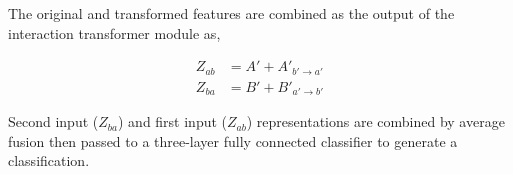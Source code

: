 \documentclass{article}
\begin{document}
\noindent The original and transformed features are combined as the output of the interaction transformer module as,

\begin{align}
Z_{ab} &= A' + A'_{b'\rightarrow a'} \\
Z_{ba} &= B' + B'_{a'\rightarrow b'}
\end{align}

\noindent Second input ($Z_{ba}$) and first input ($Z_{ab}$) representations are combined by average fusion then passed to a three-layer fully connected classifier to generate a classification.

\end{document}
